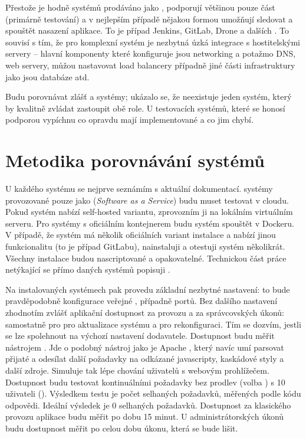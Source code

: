     Přestože je hodně systémů prodáváno jako \CICD, podporují většinou pouze \CI část (primárně testování) a v nejlepším případě nějakou formou umožňují sledovat a spouštět nasazení aplikace. To je případ Jenkins, GitLab, Drone a dalších \cite{ellingwood-cicd-list}. To souvisí s tím, že pro komplexní \CD systém je nezbytná úzká integrace s hostitelskými servery -- hlavní komponenty které \CD konfiguruje jsou networking a potažmo DNS, \HTTP web servery, můžou nastavovat load balancery případně jiné části infrastruktury jako jsou databáze atd.

    Budu porovnávat zlášť \CI a \CD systémy; ukázalo se, že neexistuje jeden systém, který by kvalitně zvládat zastoupit obě role. U testovacích systémů, které se honosí podporou \CD vypíchnu co opravdu mají implementované a co jim chybí.

    \section{Metodika porovnávání \CI systémů}
        U každého systému se nejprve seznámím s aktuální dokumentací. \CI systémy provozované pouze jako  (\textit{Software as a Service}) budu muset testovat v cloudu. Pokud systém nabízí self-hosted variantu, zprovozním ji na lokálním virtuálním serveru. Pro systémy s oficiálním kontejnerem budu systém spouštět v Dockeru. V případě, že systém má několik oficiálních variant instalace a nabízí jinou funkcionalitu (to je případ GitLabu), nainstaluji a otestuji systém několikrát. Všechny instalace budou nascriptované a opakovatelné. Technickou část práce netýkající se přímo daných \CI systémů popisuji .

        Na instalovaných systémech pak provedu základní nezbytné nastavení: to bude pravděpodobně konfigurace veřejné , případně portů.  Bez dalšího nastavení zhodnotím zvlášť aplikační dostupnost za provozu a za správcovských úkonů: samostatně pro pro aktualizace \CI systému a pro rekonfiguraci. Tím se dozvím, jestli se lze spolehnout na výchozí nastavení dodavatele. Dostupnost budu měřit nástrojem  \cite{fulmer-siege}. Jde o podobný nástroj jako je Apache  \cite{apache-ab}, který navíc umí parsovat přijaté  a odesílat další požadavky na odkázané javascripty, kaskádové styly a další zdroje. Simuluje tak lépe chování uživatelů s webovým prohlížečem. Dostupnost budu testovat kontinuálními požadavky bez prodlev (volba ) s 10 uživateli (). Výsledkem testu je počet selhaných požadavků, měřených podle \HTTP kódu odpovědi. Ideální výsledek je 0 selhaných požadavků. Dostupnost za klasického provozu aplikace budu měřit po dobu 15 minut. U administrátorských úkonů budu dostupnost měřit po celou dobu úkonu, která se bude lišit.

